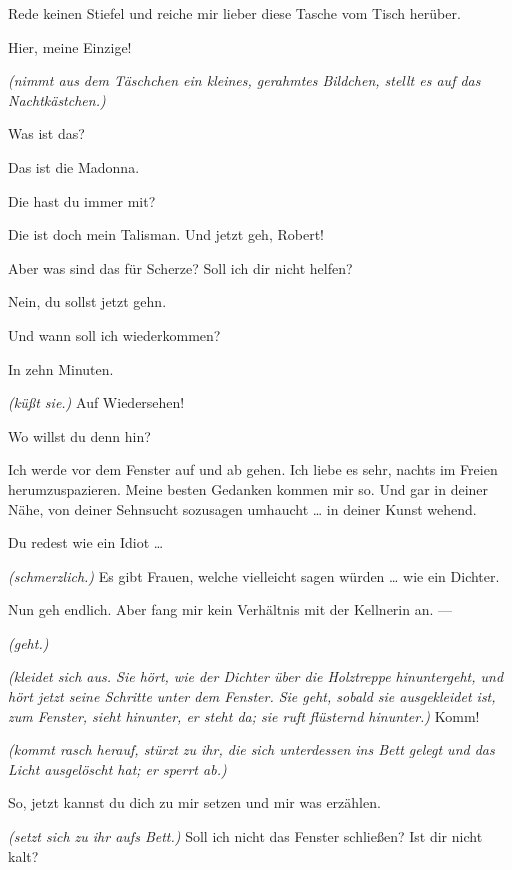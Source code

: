\documentclass[
	final,
	a4paper,
	ngerman,
	mpinclude = true, %
	twoside = true,
	open = right,
	cleardoublepage = plain,
	DIV = 13,
	BCOR = 1cm,
	titlepage = firstiscover,
	]{scrbook}
\newcommand{\direction}[1]{\textit{(#1)}}
\newcommand{\thecharacter}[1]{\textup{\textsc{#1}}}
\newcommand{\thedichter}{\thecharacter{Dichter}}
\newcommand{\theschauspielerin}{\thecharacter{Schauspielerin}}
\newcommand{\character}[1]{\item[#1:]}
\newcommand{\dichter}{\character{\thedichter}}
\newcommand{\schauspielerin}{\character{\theschauspielerin}}
\begin{document}
\begin{play}
	\schauspielerin
	Rede keinen Stiefel und reiche mir lieber diese Tasche vom Tisch herüber.

	\dichter
	Hier, meine Einzige!

	\schauspielerin
	\direction{nimmt aus dem Täschchen ein kleines, gerahmtes Bildchen, stellt es auf das Nachtkästchen.}

	\dichter
	Was ist das?

	\schauspielerin
	Das ist die Madonna.

	\dichter
	Die hast du immer mit?

	\schauspielerin
	Die ist doch mein Talisman. Und jetzt geh, Robert!

	\dichter
	Aber was sind das für Scherze? Soll ich dir nicht helfen?

	\schauspielerin
	Nein, du sollst jetzt gehn.

	\dichter
	Und wann soll ich wiederkommen?

	\schauspielerin
	In zehn Minuten.

	\dichter
	\direction{küßt sie.} Auf Wiedersehen!

	\schauspielerin
	Wo willst du denn hin?

	\dichter
	Ich werde vor dem Fenster auf und ab gehen. Ich liebe es sehr, nachts im Freien herumzuspazieren. Meine besten Gedanken kommen mir so. Und gar in deiner Nähe, von deiner Sehnsucht sozusagen umhaucht \ldots{} in deiner Kunst wehend.

	\schauspielerin
	Du redest wie ein Idiot \ldots{}

	\dichter
	\direction{schmerzlich.} Es gibt Frauen, welche vielleicht sagen würden \ldots{} wie ein Dichter.

	\schauspielerin
	Nun geh endlich. Aber fang mir kein Verhältnis mit der Kellnerin an. ---

	\dichter
	\direction{geht.}

	\schauspielerin
	\direction{kleidet sich aus. Sie hört, wie der Dichter über die Holztreppe hinuntergeht, und hört jetzt seine Schritte unter dem Fenster. Sie geht, sobald sie ausgekleidet ist, zum Fenster, sieht hinunter, er steht da; sie ruft flüsternd hinunter.} Komm!

	\dichter
	\direction{kommt rasch herauf, stürzt zu ihr, die sich unterdessen ins Bett gelegt und das Licht ausgelöscht hat; er sperrt ab.}

	\schauspielerin
	So, jetzt kannst du dich zu mir setzen und mir was erzählen.

	\dichter
	\direction{setzt sich zu ihr aufs Bett.} Soll ich nicht das Fenster schließen? Ist dir nicht kalt?


\end{play}
\end{document}
